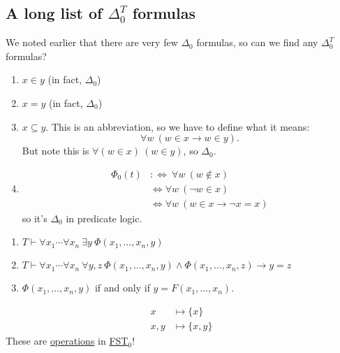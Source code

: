 \documentclass{article}
\newcommand{\named}[1]{\textbf{#1}\index{#1}}
\newcommand{\1}{\mathbbm{1}}
\begin{document}
\subsection{A long list of \texorpdfstring{$\Delta_0^T$}{Delta0T} formulas}
We noted earlier that there are very few \hyperlink{def:delta0}{$\Delta_0$} formulas, so can we find any \hyperlink{def:delta0t}{$\Delta_0^T$} formulas?
\begin{enumerate}
  \item $x \in y$ (in fact, \hyperlink{def:delta0}{$\Delta_0$})
  \item $x = y$ (in fact, $\Delta_0$)
  \item $x \subseteq y$. This is an abbreviation, so we have to define what it means:
    \begin{equation*}\forall w\ (w \in x \rightarrow w \in y).\end{equation*}
    But note this is $\forall (w \in x) \ (w \in y)$, so $\Delta_0$.
  \item
    \begin{align*}
      \Phi_0(t) &:\Longleftrightarrow\ \forall w\ (w \notin x) \\
                &\iff \forall w\ (\neg w \in x) \\
                &\iff \forall w \ (w \in x \rightarrow \neg x = x)
    \end{align*}
    so it's $\Delta_0$ in predicate logic.
\end{enumerate}
\begin{enumerate}[(1)]
  \item $T \vdash \forall x_1 \dotsm \forall x_n \ \exists y \ \Phi (x_1, \dotsc, x_n, y)$
  \item $T \vdash \forall x_1 \dotsm \forall x_n \ \forall y,z \ \Phi(x_1, \dotsc, x_n, y) \land \Phi(x_1, \dotsc, x_n, z) \rightarrow y = z$
  \item $\Phi(x_1, \dotsc, x_n, y)$ if and only if $y = F(x_1, \dotsc, x_n)$.
\end{enumerate}
\begin{eg}
  \begin{align*}
    x &\mapsto \{x\} \\
    x,y &\mapsto \{x,y\}
  \end{align*}
  These are \hyperlink{def:operation}{operations} in \hyperlink{def:axioms}{\textsf{FST}$_0$}!
\end{eg}
\end{document}
